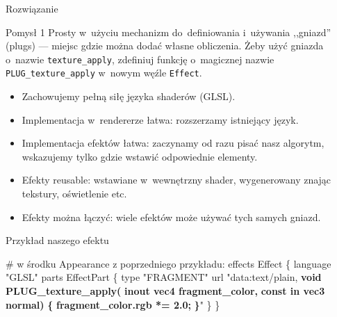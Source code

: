\documentclass{beamer}
\begin{document}
\begin{frame}{Rozwiązanie}

\begin{block}{Pomysł 1}
Prosty w~użyciu mechanizm do~definiowania i~używania
,,gniazd'' (plugs) --- miejsc gdzie można dodać własne obliczenia.
Żeby użyć gniazda o~nazwie \texttt{texture\_apply},
zdefiniuj funkcję o~magicznej nazwie \texttt{PLUG\_texture\_apply}
w~nowym węźle \texttt{Effect}.
\end{block}

\begin{itemize}
  \item Zachowujemy pełną siłę języka shaderów (GLSL).
  \item Implementacja w~rendererze łatwa: rozszerzamy istniejący język.
  \item Implementacja efektów łatwa: zaczynamy od razu pisać nasz algorytm,
    wskazujemy tylko gdzie wstawić odpowiednie elementy.
  \item Efekty reusable: wstawiane w~wewnętrzny shader, wygenerowany
    znając tekstury, oświetlenie etc.
  \item Efekty można łączyć: wiele efektów może używać tych samych gniazd.
\end{itemize}
\end{frame}

\begin{frame}[fragile]
\begin{exampleblock}{Przykład naszego efektu}
\begin{semiverbatim}
# w środku Appearance z poprzedniego przykładu:
effects Effect \{
  language "GLSL"
  parts EffectPart \{
    type "FRAGMENT"
    url "data:text/plain,
\textbf{    void PLUG\_texture\_apply(}
\textbf{      inout vec4 fragment\_color,}
\textbf{      const in vec3 normal)}
\textbf{    \{}
\textbf{      fragment\_color.rgb *= 2.0;}
\textbf{    \}}"
  \}
\}
\end{semiverbatim}
\end{exampleblock}
\end{frame}

\renewcommand*{\figurename}{Obraz}
\end{document}
